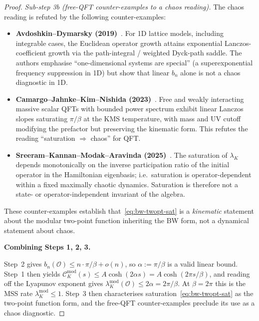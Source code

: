\documentclass[12pt,a4paper]{article}
\begin{document}
\begin{proof}
\emph{Sub-step 3b (free-QFT counter-examples to a chaos reading).}
The chaos reading is refuted by the following counter-examples:
\begin{itemize}
\item \textbf{Avdoshkin--Dymarsky (2019)}~\cite{AvdoshkinDymarsky2019}.
For 1D lattice models, including integrable cases, the Euclidean
operator growth attains exponential Lanczos-coefficient growth via
the path-integral / weighted Dyck-path saddle. The authors emphasise
``one-dimensional systems are special'' (a superexponential frequency
suppression in 1D) but show that linear $b_n$ alone is not a chaos
diagnostic in 1D.
\item \textbf{Camargo--Jahnke--Kim--Nishida (2023)}~\cite{Camargo2023}.
Free and weakly interacting massive scalar QFTs with bounded power
spectrum exhibit linear Lanczos slopes saturating $\pi/\beta$ at the
KMS temperature, with mass and UV cutoff modifying the prefactor but
preserving the kinematic form. This refutes the reading
``saturation $\Rightarrow$ chaos'' for QFT.
\item \textbf{Sreeram--Kannan--Modak--Aravinda (2025)}~\cite{Sreeram2025}.
The saturation of $\lambda_K$ depends monotonically on the inverse
participation ratio of the initial operator in the Hamiltonian
eigenbasis; i.e.\ saturation is operator-dependent within a fixed
maximally chaotic dynamics. Saturation is therefore not a state- or
operator-independent invariant of the algebra.
\end{itemize}

These counter-examples establish that~\eqref{eq:bw-twopt-sat} is a
\emph{kinematic} statement about the modular two-point function
inheriting the BW form, not a dynamical statement about chaos.

\medskip

\noindent\textbf{Combining Steps 1, 2, 3.}

Step~2 gives $b_n(\mathcal{O}) \le n\cdot\pi/\beta + o(n)$, so
$\alpha := \pi/\beta$ is a valid linear bound. Step~1 then yields
$\mathcal{C}_K^{\mathrm{mod}}(s) \le A\cosh(2\alpha s)
= A\cosh(2\pi s/\beta)$, and reading off the Lyapunov exponent
gives $\lambda_K^{\mathrm{mod}}(\mathcal{O}) \le 2\alpha = 2\pi/\beta$.
At $\beta = 2\pi$ this is the MSS rate $\lambda_K^{\mathrm{mod}} \le 1$.
Step~3 then characterises saturation~\eqref{eq:bw-twopt-sat} as the
two-point function form, and the free-QFT counter-examples preclude
its use as a chaos diagnostic.
\end{proof}
\end{document}
